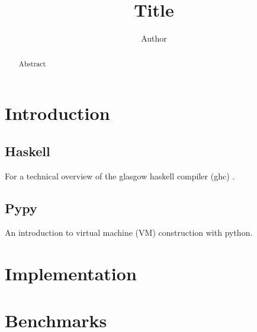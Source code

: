 \documentclass{article}
\begin{document}
\title{Title}
\author{Author}
\maketitle

\begin{abstract}
Abstract
\end{abstract}

\clearpage


\section{Introduction}

\subsection{Haskell}

For a technical overview of the glasgow haskell compiler (ghc) \cite{ghc}.

\subsection{Pypy}

An introduction to virtual machine (VM) construction with python\cite{pypy}.

\section{Implementation}


\section{Benchmarks}





\end{document}
